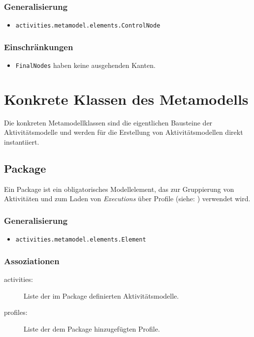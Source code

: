 \subsubsection{Generalisierung}
\begin{itemize}
\item \texttt{activities.metamodel.elements.ControlNode}
\end{itemize}

\subsubsection{Einschränkungen}
\begin{itemize}
\item \texttt{FinalNodes} haben keine ausgehenden Kanten.
\end{itemize}



\section{Konkrete Klassen des Metamodells}\label{amrep-meta-konkret}
Die konkreten Metamodellklassen sind die eigentlichen Bausteine der Aktivitätsmodelle und werden für die Erstellung von Aktivitätsmodellen direkt instantiiert.


\subsection{Package}
Ein Package ist ein obligatorisches Modellelement, das zur Gruppierung von Aktivitäten und zum Laden von \emph{Executions} über Profile (siehe: ) verwendet wird.

\subsubsection{Generalisierung}
\begin{itemize}
\item \texttt{activities.metamodel.elements.Element}
\end{itemize}

\subsubsection{Assoziationen}
\begin{description}
\item[activities:] Liste der im Package definierten Aktivitätsmodelle.
\item[profiles:] Liste der dem Package hinzugefügten Profile.
\end{description}

